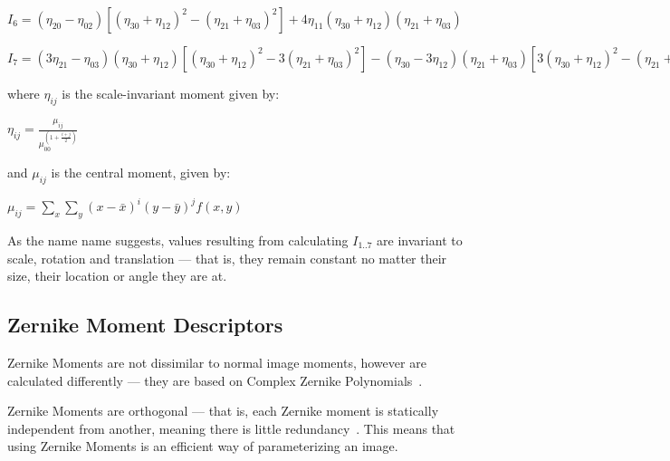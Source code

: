 $I_6 =  (\eta_{20} - \eta_{02})[(\eta_{30} + \eta_{12})^2 - (\eta_{21} + \eta_{03})^2] + 4\eta_{11}(\eta_{30} + \eta_{12})(\eta_{21} + \eta_{03})$

$I_7 = (3 \eta_{21} - \eta_{03})(\eta_{30} + \eta_{12})[(\eta_{30} + \eta_{12})^2 - 3(\eta_{21} + \eta_{03})^2] - (\eta_{30} - 3\eta_{12})(\eta_{21} + \eta_{03})[3(\eta_{30} + \eta_{12})^2 - (\eta_{21} + \eta_{03})^2]$

where $\eta_{ij}$ is the scale-invariant moment given by:

$\eta_{ij} = \frac{\mu_{ij}} {\mu_{00}^{\left(1 + \frac{i+j}{2}\right)}}\,\!$

and $\mu_{ij}$ is the central moment, given by:

$\mu_{ij} = \sum_{x} \sum_{y} (x - \bar{x})^i(y - \bar{y})^j f(x,y)$

As the name name suggests, values resulting from calculating $I_{1..7}$ are invariant to scale, rotation and translation --- that is, they remain constant no matter their size, their location or angle they are at. 

\subsection{Zernike Moment Descriptors}
\label{sec:zernike}
Zernike Moments are not dissimilar to normal image moments, however are calculated differently --- they are based on Complex Zernike Polynomials~\cite{liao1997image}.

Zernike Moments are orthogonal --- that is, each Zernike moment is statically independent from another, meaning there is little redundancy~\cite{amayeh2005accurate}. This means that using Zernike Moments is an efficient way of parameterizing an image.
